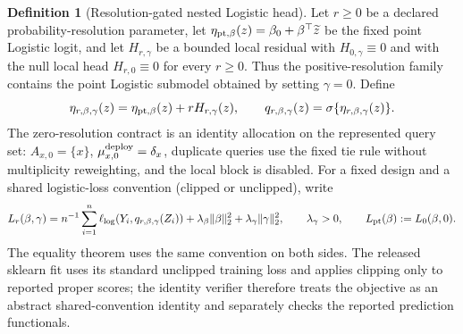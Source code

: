 \documentclass[11pt,a4paper]{article}
\numberwithin{equation}{section}
\theoremstyle{definition}\newtheorem{definition}[theorem]{Definition}
\theoremstyle{remark}\newtheorem{remark}[theorem]{Remark}
\begin{document}
\begin{definition}[Resolution-gated nested Logistic head]
Let $r\geq0$ be a declared probability-resolution parameter, let
$\eta_{\rm pt,\beta}(z)=\beta_0+\beta^\top\widetilde z$ be the fixed point Logistic
logit, and let $H_{r,\gamma}$ be a bounded local residual with
$H_{0,\gamma}\equiv0$ and with the null local head $H_{r,0}\equiv0$ for every
$r\geq0$. Thus the positive-resolution family contains the point Logistic
submodel obtained by setting $\gamma=0$. Define
\[
 \eta_{r,\beta,\gamma}(z)=\eta_{\rm pt,\beta}(z)+rH_{r,\gamma}(z),
 \qquad q_{r,\beta,\gamma}(z)=\sigma\{\eta_{r,\beta,\gamma}(z)\}.
\]
The zero-resolution contract is an identity allocation on the represented query
set: $A_{x,0}=\{x\}$, $\mu^{\rm deploy}_{x,0}=\delta_x$, duplicate queries use the
fixed tie rule without multiplicity reweighting, and the local block is disabled.
For a fixed design and a shared logistic-loss convention (clipped or unclipped), write
\[
 L_r(\beta,\gamma)=n^{-1}\sum_{i=1}^n\ell_{\log}
 (Y_i,q_{r,\beta,\gamma}(Z_i))
 +\lambda_\beta\|\beta\|_2^2+\lambda_\gamma\|\gamma\|_2^2,
 \qquad \lambda_\gamma>0,\qquad
 L_{\rm pt}(\beta):=L_0(\beta,0).
\]
The equality theorem uses the same convention on both sides. The released sklearn fit uses its
standard unclipped training loss and applies clipping only to reported proper scores; the
identity verifier therefore treats the objective as an abstract shared-convention identity
and separately checks the reported prediction functionals.
\end{definition}
\end{document}
